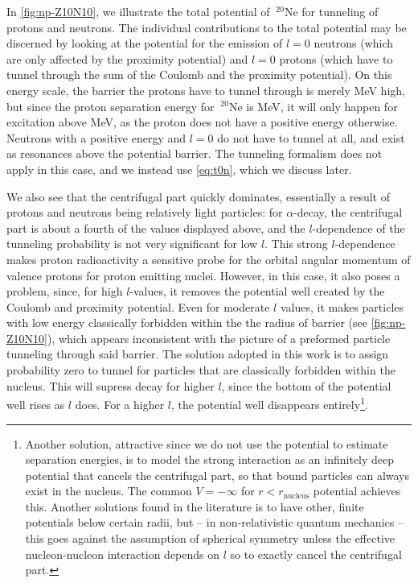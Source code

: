  In \autoref{fig:np-Z10N10}, we illustrate the total potential of $~^{20}\mathrm{Ne}$ for tunneling of protons and neutrons. The individual contributions to the total potential may be discerned by looking at the potential for the emission of $l=0$ neutrons (which are only affected by the proximity potential) and $l=0$ protons (which have to tunnel through the sum of the Coulomb and the proximity potential). %
On this energy scale, the barrier the protons have to tunnel through is merely \unit[2]{MeV} high, but since the proton separation energy for $~^{20}\mathrm{Ne}$ is \unit[12]{MeV}, it will only happen for excitation above \unit[12]{MeV}, as the proton does not have a positive energy otherwise. Neutrons with a positive energy and $l=0$ do not have to tunnel at all, and exist as resonances above the potential barrier. The tunneling formalism does not apply in this case, and we instead use \eqref{eq:t0n}, which we discuss later.

We also see that the centrifugal part quickly dominates, essentially a result of protons and neutrons being relatively light particles: for $\alpha$-decay, the centrifugal part is about a fourth of the values displayed above, and the $l$-dependence of the tunneling probability is not very significant for low $l$\cite{weisskopf:1979}.  
This strong $l$-dependence makes proton radioactivity a sensitive probe for the orbital angular momentum of valence protons for proton emitting nuclei\cite{proton-alpha-proxy:2005}. However, in this case, it also poses a problem, since, for high $l$-values, it removes the potential well created by the Coulomb and proximity potential. Even for moderate $l$ values, it makes particles with low energy classically forbidden within the the radius of barrier (see \autoref{fig:np-Z10N10}), which appears inconsistent with the picture of a preformed particle tunneling through said barrier.
The solution adopted in this work is to assign probability zero to tunnel for particles that are classically forbidden within the nucleus. This will supress decay for higher $l$, since the bottom of the potential well rises as $l$ does. For a higher $l$, the potential well disappears entirely\footnote{Another solution, attractive since we do not use the potential to estimate separation energies, is to model the strong interaction as an infinitely deep potential that cancels the centrifugal part, so that bound particles can always exist in the nucleus. The common $V=-\infty$ for $r<r_\text{nucleus}$ potential achieves this. Another solutions found in the literature is to have other, finite potentials below certain radii, but -- in non-relativistic quantum mechanics -- this goes against the assumption of spherical symmetry unless the effective nucleon-nucleon interaction depends on $l$ so to exactly cancel the centrifugal part.}.

